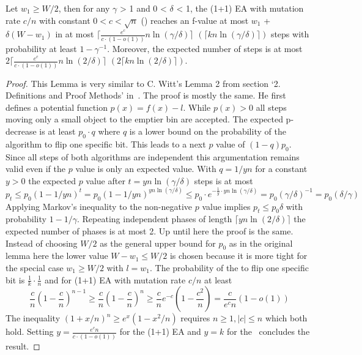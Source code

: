 \begin{lemma}\label{lemma:CWittRefined}
    Let $w_1\ge W/2$, then for any $\gamma$ > 1 and 0 < $\delta$ < 1, the (1+1) EA with mutation rate $c/n$ with constant $0<c<\sqrt{n}$ (\RLSR[k]) reaches an f-value at most $w_1$ + $\delta(W-w_1)$ in at most $\lceil\frac{e^c}{c\cdot(1-o(1))}n\ln(\gamma/\delta)\rceil$ $(\lceil kn\ln(\gamma/\delta)\rceil)$ steps with probability at least $1-\gamma^{-1}$. Moreover, the expected number of steps is at most $2\lceil\frac{e^c}{c\cdot(1-o(1))}n\ln(2/\delta)\rceil$ $(2\lceil kn\ln(2/\delta)\rceil)$.
\end{lemma}
\begin{proof}
    This Lemma is very similar to C. Witt's  Lemma 2 from section `2. Definitions and Proof Methods' in~\cite{witt2005worst}.
    The proof is mostly the same.
    He first defines a potential function $p(x)=f(x)-l$.
    While $p(x)>0$ all steps moving only a small object to the emptier bin are accepted.
    The expected p-decrease is at least $p_0\cdot q$ where $q$ is a lower bound on the probability of the algorithm to flip one specific bit.
    This leads to a next $p$ value of $(1-q)p_0$.
    Since all steps of both algorithms are independent this argumentation remains valid even if the $p$ value is only an expected value.
    With $q=1/yn$ for a constant $y>0$ the expected $p$ value after $t=yn\ln(\gamma/\delta)$ steps is at most
    \[p_t\le p_0{(1-1/yn)}^t=p_0{(1-1/yn)}^{yn\ln(\gamma/\delta)}\le p_0\cdot e^{-\frac{1}{y}\cdot yn\ln(\gamma/\delta)}=p_0{(\gamma/\delta)}^{-1} = p_0(\delta/\gamma)\]
    Applying Markov's inequality to the non-negative $p$ value implies $p_t\le p_0\delta$ with probability $1-1/\gamma$.
    Repeating independent phases of length $\lceil yn\ln(2/\delta)\rceil$ the expected number of phases is at most 2.
    Up until here the proof is the same.\newline
    Instead of choosing $W/2$ as the general upper bound for $p_0$ as in the original lemma here the lower value $W-w_1\le W/2$ is chosen because it is more tight for the special case $w_1\ge W/2$ with $l=w_1$.
    The probability of the \RLSR[k] to flip one specific bit is \(\frac{1}{k}\cdot\frac{1}{n}\) and for (1+1) EA with mutation rate $c/n$ at least
    \[
        \frac{c}{n}{(1-\frac{c}{n})}^{n-1}
        \ge \frac{c}{n}{(1-\frac{c}{n})}^{n}
        \ge \frac{c}{n}e^{-c}(1-\frac{c^2}{n})
        = \frac{c}{e^c n}(1-o(1))
    \]
    The inequality \({(1+x/n)}^n\ge e^x (1-{x^2}/n)\) requires $n\ge1, |c|\le n$ which both hold.
    Setting $y=\frac{e^c n}{c\cdot(1-o(1))}$ for the (1+1) EA and $y=k$ for the \RLSR~concludes the result.
\end{proof}

